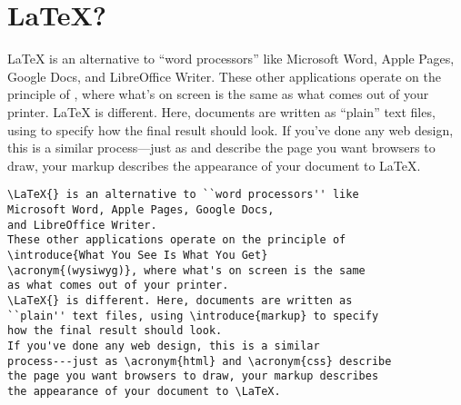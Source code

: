 \section{\texorpdfstring{\LaTeX}{LaTeX}?}

\LaTeX{} is an alternative to ``word processors'' like
Microsoft Word, Apple Pages, Google Docs,
and LibreOffice Writer.
These other applications operate on the principle of
, where what's on screen is the same
as what comes out of your printer.
\LaTeX{} is different. Here, documents are written as
``plain'' text files, using  to specify
how the final result should look.
If you've done any web design, this is a similar
process---just as  and  describe
the page you want browsers to draw, your markup describes
the appearance of your document to \LaTeX.

\begin{samepage}
\begin{leftfigure}
\begin{lstlisting}
\LaTeX{} is an alternative to ``word processors'' like
Microsoft Word, Apple Pages, Google Docs,
and LibreOffice Writer.
These other applications operate on the principle of
\introduce{What You See Is What You Get}
\acronym{(wysiwyg)}, where what's on screen is the same
as what comes out of your printer.
\LaTeX{} is different. Here, documents are written as
``plain'' text files, using \introduce{markup} to specify
how the final result should look.
If you've done any web design, this is a similar
process---just as \acronym{html} and \acronym{css} describe
the page you want browsers to draw, your markup describes
the appearance of your document to \LaTeX.
\end{lstlisting}
\end{leftfigure}
\end{samepage}

